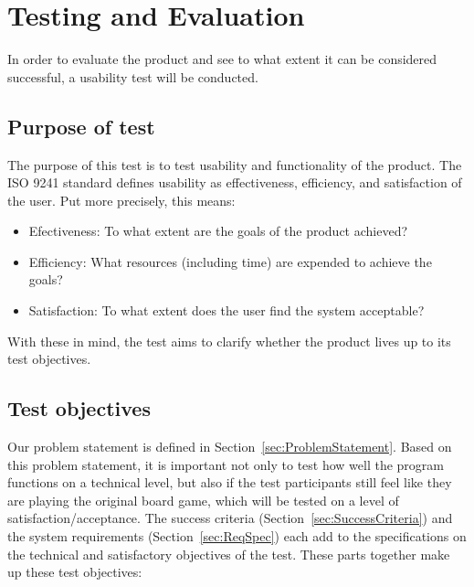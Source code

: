 \chapter{Testing and Evaluation}\label{ch:testeval}
In order to evaluate the product and see to what extent it can be considered successful, a usability test will be conducted.

\section{Purpose of test}
The purpose of this test is to test usability and functionality of the product. The ISO 9241 \citep{ISO} standard defines usability as effectiveness, efficiency, and satisfaction of the user. Put more precisely, this means:
\begin{itemize}
\item Efectiveness: To what extent are the goals of the product achieved?
\item Efficiency: What resources (including time) are expended to achieve the goals?
\item Satisfaction: To what extent does the user find the system acceptable?
\end{itemize}
With these in mind, the test aims to clarify whether the product lives up to its test objectives.

\section{Test objectives}
Our problem statement is defined in Section~\ref{sec:ProblemStatement}. Based on this problem statement, it is important not only to test how well the program functions on a technical level, but also if the test participants still feel like they are playing the original board game, which will be tested on a level of satisfaction/acceptance.
The success criteria (Section~\ref{sec:SuccessCriteria}) and the system requirements (Section~\ref{sec:ReqSpec}) each add to the specifications on the technical and satisfactory  objectives of the test.
These parts together make up these test objectives:

